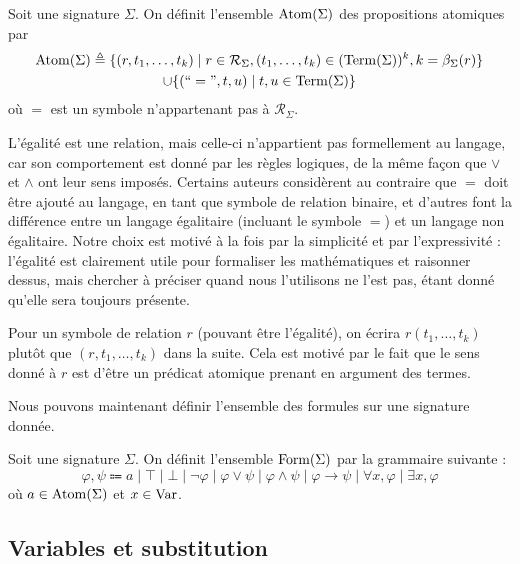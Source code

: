 \begin{definition}
  Soit une signature $\Sigma$. On définit l'ensemble $\operatorname{Atom}(\Sigma)$ des
  propositions atomiques par
  \begin{multline*}
    \operatorname{Atom}(\Sigma) \triangleq \{(r,t_1,\ldots,t_k)\mid r\in\mathcal R_\Sigma,
    (t_1,\ldots,t_k) \in (\operatorname{Term}(\Sigma))^k, k = \beta_\Sigma(r)\}\\
    \cup\{(``=",t,u)\mid t,u\in \operatorname{Term}(\Sigma)\}
  \end{multline*}
  où $=$ est un symbole n'appartenant pas à $\mathcal R_\Sigma$.
\end{definition}

\begin{remark}
  L'égalité est une relation, mais celle-ci n'appartient pas formellement au
  langage, car son comportement est donné par les règles logiques, de la même
  façon que $\lor$ et $\land$ ont leur sens imposés. Certains auteurs
  considèrent au contraire que $=$ doit être ajouté au langage, en tant que
  symbole de relation binaire, et d'autres font la différence entre un langage
  égalitaire (incluant le symbole $=$) et un langage non égalitaire. Notre choix
  est motivé à la fois par la simplicité et par l'expressivité : l'égalité est
  clairement utile pour formaliser les mathématiques et raisonner dessus, mais
  chercher à préciser quand nous l'utilisons ne l'est pas, étant donné qu'elle
  sera toujours présente.
\end{remark}

\begin{notation}
  Pour un symbole de relation $r$ (pouvant être l'égalité), on écrira
  $r(t_1,\ldots,t_k)$ plutôt que $(r,t_1,\ldots,t_k)$ dans la suite. Cela est
  motivé par le fait que le sens donné à $r$ est d'être un prédicat atomique
  prenant en argument des termes.
\end{notation}

Nous pouvons maintenant définir l'ensemble des formules sur une signature
donnée.

\begin{definition}[Formules]
  Soit une signature $\Sigma$. On définit l'ensemble $\operatorname{Form}(\Sigma)$ par
  la grammaire suivante :
  \[\varphi,\psi \Coloneq a\mid \top\mid\bot\mid\lnot\varphi
  \mid\varphi\lor\psi\mid \varphi\land\psi\mid \varphi\to\psi\mid
  \forall x,\varphi\mid \exists x,\varphi\]
  où $a\in \operatorname{Atom}(\Sigma)$ et $x\in \operatorname{Var}$.
\end{definition}

\subsection{Variables et substitution}

